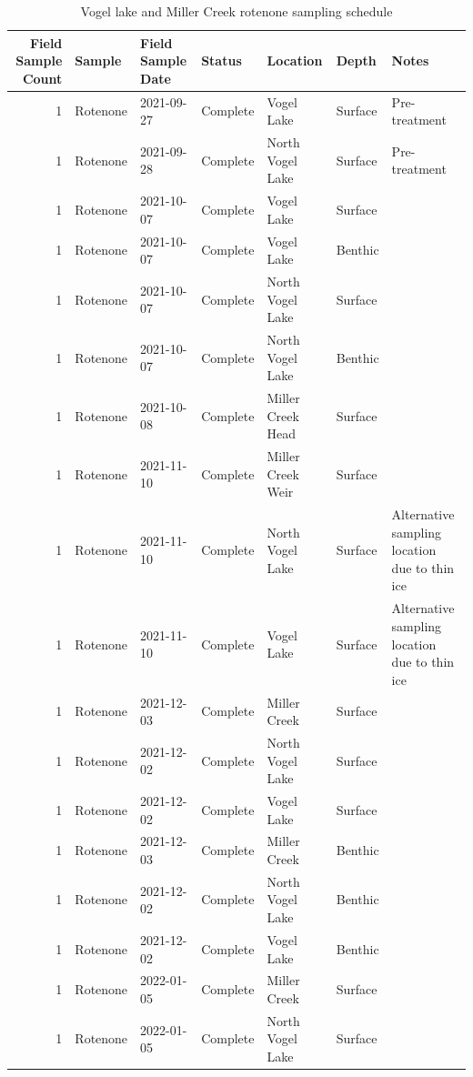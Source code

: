 \documentclass[
]{book}
\begin{document}
\begin{table}

\caption{\label{tab:sample-schedule}Vogel lake and Miller Creek rotenone sampling schedule}
\centering
\begin{tabular}[t]{r|l|l|l|l|l|l}
\hline
Field Sample Count & Sample & Field Sample Date & Status & Location & Depth & Notes\\
\hline
1 & Rotenone & 2021-09-27 & Complete & Vogel Lake & Surface & Pre-treatment\\
\hline
1 & Rotenone & 2021-09-28 & Complete & North Vogel Lake & Surface & Pre-treatment\\
\hline
1 & Rotenone & 2021-10-07 & Complete & Vogel Lake & Surface & \\
\hline
1 & Rotenone & 2021-10-07 & Complete & Vogel Lake & Benthic & \\
\hline
1 & Rotenone & 2021-10-07 & Complete & North Vogel Lake & Surface & \\
\hline
1 & Rotenone & 2021-10-07 & Complete & North Vogel Lake & Benthic & \\
\hline
1 & Rotenone & 2021-10-08 & Complete & Miller Creek Head & Surface & \\
\hline
1 & Rotenone & 2021-11-10 & Complete & Miller Creek Weir & Surface & \\
\hline
1 & Rotenone & 2021-11-10 & Complete & North Vogel Lake & Surface & Alternative sampling location due to thin ice\\
\hline
1 & Rotenone & 2021-11-10 & Complete & Vogel Lake & Surface & Alternative sampling location due to thin ice\\
\hline
1 & Rotenone & 2021-12-03 & Complete & Miller Creek & Surface & \\
\hline
1 & Rotenone & 2021-12-02 & Complete & North Vogel Lake & Surface & \\
\hline
1 & Rotenone & 2021-12-02 & Complete & Vogel Lake & Surface & \\
\hline
1 & Rotenone & 2021-12-03 & Complete & Miller Creek & Benthic & \\
\hline
1 & Rotenone & 2021-12-02 & Complete & North Vogel Lake & Benthic & \\
\hline
1 & Rotenone & 2021-12-02 & Complete & Vogel Lake & Benthic & \\
\hline
1 & Rotenone & 2022-01-05 & Complete & Miller Creek & Surface & \\
\hline
1 & Rotenone & 2022-01-05 & Complete & North Vogel Lake & Surface & \\
\hline

\end{tabular}
\end{table}
\end{document}
